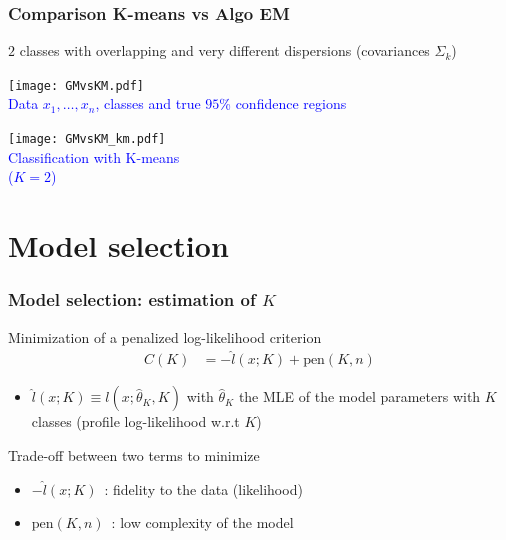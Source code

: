 \documentclass[compress, smaller, serif, 9pt]{beamer}
\begin{document}
\begin{frame}
   \frametitle{Comparison K-means vs Algo EM}

\begin{block}{$2$ classes with overlapping and very different dispersions (covariances $\Sigma_k$) }
   \end{block}
   
\begin{minipage}{.49\textwidth}
\begin{center}
    \texttt{[image: GMvsKM.pdf]}\\
    \textcolor{blue}{Data $x_1,\ldots,x_n$, classes and true $95$\% confidence regions}
\end{center}
\end{minipage}
\hfill
\begin{minipage}{.49\textwidth}
\begin{center}
    \texttt{[image: GMvsKM\_km.pdf]}\\
    \textcolor{blue}{Classification with K-means\\ ($K=2$)}
\end{center}
\end{minipage}

\end{frame}


\section{Model selection}



\begin{frame}
   \frametitle{Model selection: estimation of $K$}

   \begin{block}{Minimization of a penalized log-likelihood criterion}
   \begin{align*} C(K)&= -\hat{l}(x ; K) + \textrm{pen}(K,n)
   \end{align*}
   \begin{itemize}
    \item $\hat{l}(x; K) \equiv l(x ; \hat{\theta}_K, K)$ with $\hat{\theta}_K$ the MLE
    of the model parameters with $K$ classes (profile log-likelihood  w.r.t $K$)
   \end{itemize}
   
  Trade-off between two terms to minimize
   \begin{itemize}
    \item $-\hat{l}(x ; K)$~: fidelity to the data (likelihood)
    \item $\textrm{pen}(K,n)$~: low complexity of the model
   \end{itemize}
   \end{block}

 
\end{frame}
\end{document}
